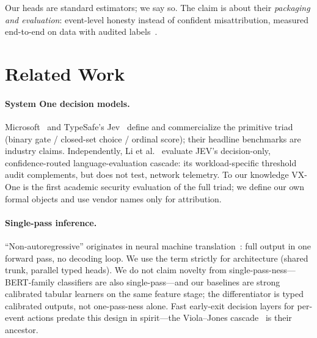 \documentclass[sigconf,anonymous=false]{acmart}
\begin{document}
Our heads are standard estimators; we say so. The claim is about their \emph{packaging and evaluation}: event-level honesty instead of confident misattribution, measured end-to-end on data with audited labels~\cite{engelen2021,lanvin2022errors}.

\section{Related Work}
\label{sec:related}

\paragraph{System One decision models.} Microsoft~\cite{msdecision1,mslearn-decision1} and TypeSafe's Jev~\cite{jevdocs,typesafejev} define and commercialize the primitive triad (binary gate / closed-set choice / ordinal score); their headline benchmarks are industry claims. Independently, Li et al.~\cite{li2026jevjudge} evaluate JEV's decision-only, confidence-routed language-evaluation cascade: its workload-specific threshold audit complements, but does not test, network telemetry. To our knowledge VX-One is the first academic security evaluation of the full triad; we define our own formal objects and use vendor names only for attribution.

\paragraph{Single-pass inference.} ``Non-autoregressive'' originates in neural machine translation~\cite{gu2018nat}: full output in one forward pass, no decoding loop. We use the term strictly for architecture (shared trunk, parallel typed heads). We do not claim novelty from single-pass-ness---BERT-family classifiers are also single-pass---and our baselines are strong calibrated tabular learners on the same feature stage; the differentiator is typed calibrated outputs, not one-pass-ness alone. Fast early-exit decision layers for per-event actions predate this design in spirit---the Viola--Jones cascade~\cite{violajones2001} is their ancestor.
\end{document}
